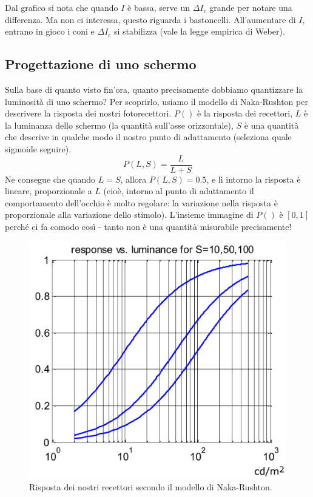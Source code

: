 \documentclass[a4paper,11pt]{article}
\begin{document}
Dal grafico si nota che quando $I$ è bassa, serve un $\Delta I_c$ grande per notare una differenza. Ma non ci interessa, questo riguarda i bastoncelli.
All'aumentare di $I$, entrano in gioco i coni e $\Delta I_c$ si stabilizza (vale la legge empirica di Weber).

\subsection{Progettazione di uno schermo}
Sulla base di quanto visto fin'ora, quanto precisamente dobbiamo quantizzare la luminosità di uno schermo?
Per scoprirlo, usiamo il modello di Naka-Rushton per descrivere la risposta dei nostri fotorecettori. $P()$ è la risposta dei recettori,
$L$ è la luminanza dello schermo (la quantità sull'asse orizzontale), $S$ è una quantità che descrive in qualche modo il nostro punto di adattamento (seleziona quale sigmoide seguire).
\[P(L, S) = \frac{L}{L+S}\]
Ne consegue che quando $L = S$, allora $P(L,S) = 0.5$, e lì intorno la risposta è lineare, proporzionale a $L$ (cioè, intorno al punto di adattamento il comportamento dell'occhio
è molto regolare: la variazione nella risposta è proporzionale alla variazione dello stimolo).
\newline
L'insieme immagine di $P()$ è $[0,1]$ perché ci fa comodo così - tanto non è una quantità misurabile precisamente!

\newpage
\renewcommand{\thefigure}{2.7}
\begin{figure}[!h]
  \centering
    \includegraphics[scale=0.5]{images/2/naka_rushton.png}
    \caption{Risposta dei nostri recettori secondo il modello di Naka-Rushton.}
\end{figure}
\end{document}
